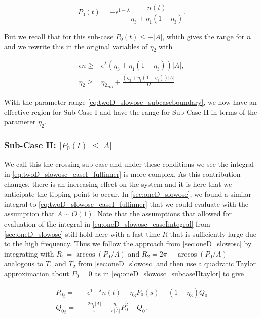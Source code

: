 \begin{equation*}
P_0(t) = -\epsilon^{1-\lambda}\frac{n(t)}{\eta_3+\eta_1(1-\eta_3)}.
\end{equation*}

But we recall that for this sub-case $P_0(t)\le -|A|$, which gives the range for $n$ and we rewrite this in the original variables of $\eta_2$ with

\begin{equation}\label{eq:twoD_slowosc_subcaseboundary}
\begin{aligned}
\epsilon n \ge & \epsilon^\lambda (\eta_3+\eta_1(1-\eta_3))|A|,\\
\eta_2 \ge& {\eta_2}_{ns} +\frac{(\eta_3+\eta_1(1-\eta_3))|A|}{\Omega}.
\end{aligned}
\end{equation}

With the parameter range \eqref{eq:twoD_slowosc_subcaseboundary}, we now have an effective region for Sub-Case I and have the range for Sub-Case II in terms of the parameter $\eta_2$.

\subsubsection{Sub-Case II: $|P_0(t)|\le |A|$}

We call this the crossing sub-case and under these conditions we see the integral in \eqref{eq:twoD_slowosc_caseI_fullinner} is more complex. As this contribution changes, there is an increasing effect on the system and it is here that we anticipate the tipping point to occur. In \autoref{sec:oneD_slowosc}, we found a similar integral to \eqref{eq:twoD_slowosc_caseI_fullinner} that we could evaluate with the assumption that $A\sim O(1)$. Note that the assumptions that allowed for evaluation of the integral in \eqref{eq:oneD_slowosc_caseIintegral} from \autoref{sec:oneD_slowosc} still hold here with a fast time $R$ that is sufficiently large due to the high frequency. Thus we follow the approach from \autoref{sec:oneD_slowosc} by integrating with $R_1=\arccos(P_0/A)$ and $R_2 = 2\pi-\arccos(P_0/A)$ analogous to $T_1$ and $T_2$ from \autoref{sec:oneD_slowosc} and then use a quadratic Taylor approximation about $P_0=0$ as in \eqref{eq:oneD_slowosc_subcaseIItaylor} to give

\begin{equation}\label{eq:twoD_slowosc_subcaseII_taylor}
\begin{aligned}
{P_0}_t =& -\epsilon^{1-\lambda}n(t)-\eta_3 P_0(s)-(1-\eta_3)Q_0\\
{Q_0}_t =&-\frac{2\eta_1|A|}{\pi}-\frac{\eta_1}{\pi|A|}P_0^2-Q_0.
\end{aligned}
\end{equation}

